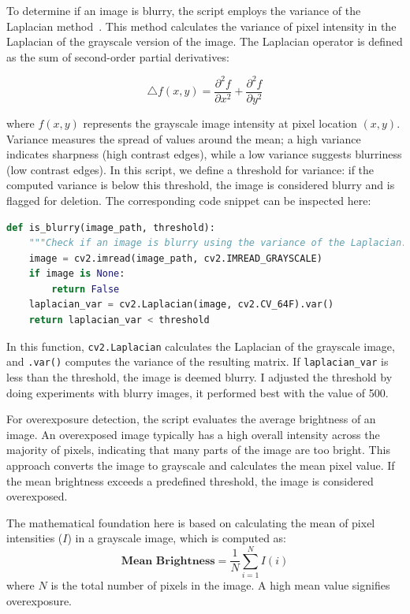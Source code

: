 To determine if an image is blurry, the script employs the variance of the Laplacian method~\cite{blur_detection}. This method calculates the variance of pixel intensity in the Laplacian of the grayscale version of the image. The Laplacian operator is defined as the sum of second-order partial derivatives:

\begin{equation}
 \triangle \mathit{f}\left (x,y  \right )= \frac{\partial^2 f }{\partial x^2} + \frac{\partial^2 f }{\partial y^2}
\end{equation}

where \(f(x,y)\) represents the grayscale image intensity at pixel location \((x,y)\). Variance measures the spread of values around the mean; a high variance indicates sharpness (high contrast edges), while a low variance suggests blurriness (low contrast edges). In this script, we define a threshold for variance: if the computed variance is below this threshold, the image is considered blurry and is flagged for deletion. 
The corresponding code snippet can be inspected here:

\FloatBarrier
\begin{lstlisting}[language=python,frame=single,float=!ht]
def is_blurry(image_path, threshold):
    """Check if an image is blurry using the variance of the Laplacian."""
    image = cv2.imread(image_path, cv2.IMREAD_GRAYSCALE)
    if image is None:
        return False
    laplacian_var = cv2.Laplacian(image, cv2.CV_64F).var()
    return laplacian_var < threshold
\end{lstlisting}
\FloatBarrier

In this function, \verb|cv2.Laplacian| calculates the Laplacian of the grayscale image, and \verb|.var()| computes the variance of the resulting matrix. If \verb|laplacian_var| is less than the threshold, the image is deemed blurry. I adjusted the threshold by doing experiments with blurry images, it performed best with the value of 500.

For overexposure detection, the script evaluates the average brightness of an image. An overexposed image typically has a high overall intensity across the majority of pixels, indicating that many parts of the image are too bright. This approach converts the image to grayscale and calculates the mean pixel value. If the mean brightness exceeds a predefined threshold, the image is considered overexposed.

The mathematical foundation here is based on calculating the mean of pixel intensities (\(I\)) in a grayscale image, which is computed as:
\begin{equation}
    \textbf{Mean Brightness} = \frac{1}{N}\sum_{i=1}^{N} I\left ( i \right )
\end{equation}
where \(N\) is the total number of pixels in the image. A high mean value signifies overexposure.

